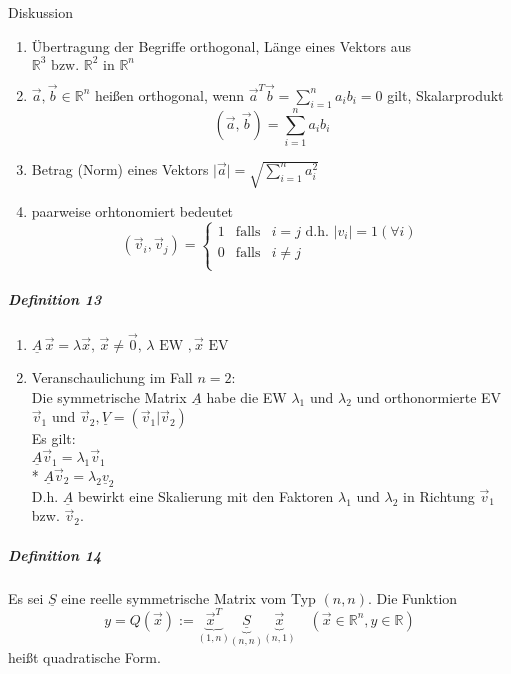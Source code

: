 \documentclass[a4paper]{scrartcl}
\begin{document}
Diskussion
\begin{enumerate}
\item Übertragung der Begriffe orthogonal, Länge eines Vektors aus $\mathbb{R}^3 \text{ bzw. } \mathbb{R}^2 \text{ in } \mathbb{R}^n$
\item $\vec{a}, \vec{b} \in \mathbb{R}^n$ heißen orthogonal, wenn $\vec{a}^T \vec{b} = \sum\limits_{i=1}^n a_i b_i = 0$ gilt, Skalarprodukt
\[ (\vec{a},\vec{b}) = \sum\limits_{i=1}^n a_i b_i\]
\item Betrag (Norm) eines Vektors $\lvert \vec{a} \rvert = \sqrt{\sum\limits_{i=1}^n a_i^2}$
\item paarweise orhtonomiert bedeutet 
\[ (\vec{v}_i,\vec{v}_j) = \left\{ \begin{array}{rcl}
         1
         & \mbox{falls}
         & i=j  \text{ d.h. } \lvert v_i \rvert = 1 (\forall i)\\ 
        0
         & \mbox{falls} 
         & i \neq j \\
                \end{array}\right.\]
\end{enumerate}

\subparagraph{Definition 13} \begin{enumerate}
\item $\underline{A} \, \vec{x} = \lambda \vec{x}, \, \vec{x} \neq \vec{0},\, \lambda \text{ EW }, \vec{x} \text{ EV}$
\item Veranschaulichung im Fall $n=2$:\\
Die symmetrische Matrix $\underline{A}$ habe die EW $\lambda_1$ und $\lambda_2$ und orthonormierte EV $\vec{v}_1$ und $\vec{v}_2, \underline{V} = (\vec{v}_1|\vec{v}_2)$\\
Es gilt: \\
$\underline{A} \vec{v}_1 = \lambda_1 \vec{v}_1$\\*
$\underline{A} \vec{v}_2 = \lambda_2 \underline{v}_2$\\
D.h. $\underline{A}$ bewirkt eine Skalierung mit den Faktoren $\lambda_1$ und $\lambda_2$ in Richtung $\vec{v}_1$ bzw. $\vec{v}_2$.

\end{enumerate}

\subparagraph{Definition 14} Es sei $\underline{S}$ eine reelle symmetrische Matrix vom Typ $(n,n)$. Die Funktion
\[ y= Q(\vec{x}) := \underbrace{\vec{x}^T}_{(1,n)} \underbrace{\underline{S}}_{(n,n)} \underbrace{\vec{x}}_{(n,1)} \quad (\vec{x} \in \mathbb{R}^n, y \in \mathbb{R})\]
heißt quadratische Form.
\end{document}
